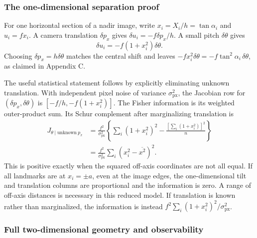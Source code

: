 \subsubsection{The one-dimensional separation proof}

For one horizontal section of a nadir image, write
$x_i=X_i/h=\tan\alpha_i$ and $u_i=f x_i$. A camera translation
$\delta p_x$ gives $\delta u_i=-f\delta p_x/h$. A small pitch
$\delta\theta$ gives
\begin{equation}
 \delta u_i=-f(1+x_i^2)\delta\theta.
\end{equation}
Choosing $\delta p_x=h\delta\theta$ matches the central shift and leaves
$-f x_i^2\delta\theta=-f\tan^2\alpha_i\,\delta\theta$, as claimed in
Appendix C.

The useful statistical statement follows by explicitly eliminating
unknown translation. With independent pixel noise of variance
$\sigma_{\mathrm{px}}^2$, the Jacobian row for
$(\delta p_x,\delta\theta)$ is
$[-f/h,-f(1+x_i^2)]$. The Fisher information is its weighted outer-product
sum. Its Schur complement after marginalizing translation is
\begin{align}
 J_{\theta\mid\mathrm{unknown}\ p_x}
 &=\frac{f^2}{\sigma_{\mathrm{px}}^2}
   \left\{\sum_i(1+x_i^2)^2-
                    \frac{[\sum_i(1+x_i^2)]^2}{n}\right\}\\
 &=\frac{f^2}{\sigma_{\mathrm{px}}^2}
                  \sum_i(x_i^2-\overline{x^2})^2.
 \label{eq:tilt-information}
\end{align}
This is positive exactly when the squared off-axis coordinates are not
all equal. If all landmarks are at $x_i=\pm a$, even at the image edges,
the one-dimensional tilt and translation columns are proportional and
the information is zero. A range of off-axis distances is necessary in
this reduced model. If translation is known rather than marginalized,
the information is instead
$f^2\sum_i(1+x_i^2)^2/\sigma_{\mathrm{px}}^2$.

\subsubsection{Full two-dimensional geometry and observability}

